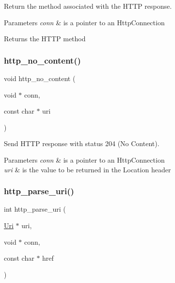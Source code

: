 Return the method associated with the H\+T\+TP response. 


\begin{DoxyParams}{Parameters}
{\em conn} & is a pointer to an Http\+Connection \\
\hline
\end{DoxyParams}
\begin{DoxyReturn}{Returns}
the H\+T\+TP method 
\end{DoxyReturn}
\mbox{\label{group__http__connection_ga48e49b5c445099537f9b9b4ae89fa8df}} 
\subsubsection{\texorpdfstring{http\+\_\+no\+\_\+content()}{http\_no\_content()}}
{\footnotesize\ttfamily void http\+\_\+no\+\_\+content (\begin{DoxyParamCaption}\item[{void $\ast$}]{conn,  }\item[{const char $\ast$}]{uri }\end{DoxyParamCaption})}



Send H\+T\+TP response with status 204 (No Content). 


\begin{DoxyParams}{Parameters}
{\em conn} & is a pointer to an Http\+Connection \\
\hline
{\em uri} & is the value to be returned in the Location header \\
\hline
\end{DoxyParams}
\mbox{\label{group__http__connection_ga08146812d01ea110926efc6dbf39b91d}} 
\subsubsection{\texorpdfstring{http\+\_\+parse\+\_\+uri()}{http\_parse\_uri()}}
{\footnotesize\ttfamily int http\+\_\+parse\+\_\+uri (\begin{DoxyParamCaption}\item[{\hyperlink{structUri}{Uri} $\ast$}]{uri,  }\item[{void $\ast$}]{conn,  }\item[{const char $\ast$}]{href }\end{DoxyParamCaption})}



